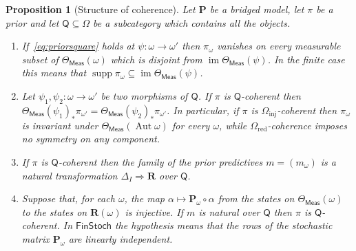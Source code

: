 \documentclass[11pt,a4paper]{article}
\theoremstyle{plain}
\newtheorem{proposition}[theorem]{Proposition}
\theoremstyle{definition}
\theoremstyle{remark}
\newcommand{\cat}[1]{\mathsf{#1}}
\newcommand{\catO}{\cat{\Omega}}
\newcommand{\Meas}{\cat{Meas}}
\newcommand{\FinStoch}{\cat{FinStoch}}
\begin{document}
\begin{proposition}[Structure of coherence]\label{prop:coherence}
Let $\mathbf P$ be a bridged model, let $\pi$ be a prior and let
$\cat{Q} \subseteq \catO$ be a subcategory which contains all the objects.
\begin{enumerate}
\item If~\eqref{eq:priorsquare} holds at $\psi \colon \omega \to \omega'$ then
$\pi_{\omega}$ vanishes on every measurable subset of $\Theta_\Meas(\omega)$
which is disjoint from $\operatorname{im}\Theta_\Meas(\psi)$. In the finite
case this means that
$\operatorname{supp}\pi_{\omega} \subseteq \operatorname{im}\Theta_\Meas(\psi)$.
\item Let $\psi_1,\psi_2 \colon \omega \to \omega'$ be two morphisms of
$\cat{Q}$. If $\pi$ is $\cat{Q}$-coherent then
$\Theta_\Meas(\psi_1)_{*}\pi_{\omega'} = \Theta_\Meas(\psi_2)_{*}\pi_{\omega'}$.
In particular, if $\pi$ is $\catO_{\mathrm{inj}}$-coherent then $\pi_{\omega}$
is invariant under $\Theta_\Meas(\operatorname{Aut}\omega)$ for every
$\omega$, while $\catO_{\mathrm{red}}$-coherence imposes no symmetry on any
component.
\item If $\pi$ is $\cat{Q}$-coherent then the family of the prior predictives
$m = (m_{\omega})$ is a natural transformation
$\Delta_{I} \Rightarrow \mathbf{R}$ over $\cat{Q}$.
\item Suppose that, for each $\omega$, the map
$\alpha \mapsto \mathbf P_{\omega}\circ\alpha$ from the states on
$\Theta_\Meas(\omega)$ to the states on $\mathbf{R}(\omega)$ is injective. If
$m$ is natural over $\cat{Q}$ then $\pi$ is $\cat{Q}$-coherent. In $\FinStoch$
the hypothesis means that the rows of the stochastic matrix
$\mathbf P_{\omega}$ are linearly independent.
\end{enumerate}
\end{proposition}
\end{document}
